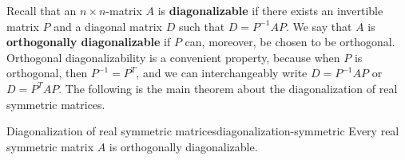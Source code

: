 \documentclass{ximera}
\begin{document}
Recall that an $n\times n$-matrix $A$ is \textbf{diagonalizable}%
%
 if there exists an invertible matrix $P$
and a diagonal matrix $D$ such that $D = P^{-1}AP$. We say that $A$ is
\textbf{orthogonally diagonalizable}%
%
%
%
%
 if $P$ can, moreover, be
chosen to be orthogonal. Orthogonal diagonalizability is a convenient
property, because when $P$ is orthogonal, then $P^{-1}=P^T$, and we
can interchangeably write $D = P^{-1}AP$ or $D = P^TAP$.  The
following is the main theorem about the diagonalization of real
symmetric matrices.

\begin{theorem}{Diagonalization of real symmetric matrices}{diagonalization-symmetric}
  Every real symmetric matrix $A$ is orthogonally diagonalizable.
\end{theorem}
\end{document}
